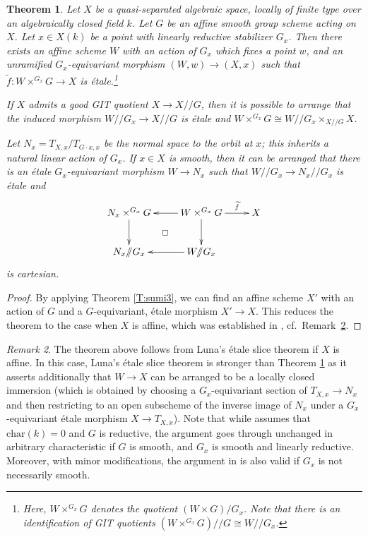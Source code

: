 \documentclass[a4paper]{amsart}
\theoremstyle{plain}
\newtheorem{theorem}{Theorem}[section]
\theoremstyle{definition}
\theoremstyle{remark}
\newtheorem{remark}[theorem]{Remark}
\numberwithin{equation}{section}
\newcommand\co{\colon}
\newcommand{\gitq}{/\!\!/}
\renewcommand{\tilde}{\widetilde}
\begin{document}
\begin{theorem}\label{T:luna}
Let $X$ be a quasi-separated algebraic space, locally of finite type over an algebraically closed field $k$. Let $G$ be an affine smooth group scheme acting on $X$.  Let $x \in X(k)$ be a point with linearly reductive stabilizer $G_x$.   Then there exists an affine scheme $W$ with an action of $G_x$ which fixes a point $w$, and an unramified $G_x$-equivariant morphism $(W,w) \to (X,x)$ such that $\tilde{f} \co W \times^{G_x} G \to X$ is \'etale.\footnote{Here, $W \times^{G_x} G$ denotes the quotient $(W \times G) / G_x$.  Note that there is an identification of GIT quotients  $(W \times^{G_x} G) \gitq G \cong W \gitq G_x$.}

 If $X$ admits a good GIT quotient $X \to X \gitq G$, then it is possible to arrange that the induced morphism $W \gitq G_x \to X \gitq G$ is \'etale and $W \times^{G_x} G \cong W \gitq G_x \times_{X \gitq G} X$.
 
Let $N_x = T_{X,x} / T_{G \cdot x, x}$ be the normal space to the orbit at $x$; this inherits a natural linear action of $G_x$.  If $x \in X$ is smooth, then it can be arranged that there is an \'etale $G_x$-equivariant morphism $W \to N_x$ such that $W \gitq G_x \to N_x \gitq G_x$ is \'etale and 
 $$\xymatrix{
N_x \times^{G_x} G \ar[d] &  W \times^{G_x} G\ar[r]^-{\tilde f} \ar[d] \ar[l]	& X \\
N_x \gitq G_x & W \gitq G_x \ar[l]	\ar@{}[ul]|\square				& 
}$$
is cartesian.
\end{theorem} 
\begin{proof}
By applying Theorem \ref{T:sumi3}, we can find an affine scheme $X'$ with an action of $G$ and a $G$-equivariant, \'etale morphism $X' \to X$.  This reduces the theorem to the case when $X$ is affine, which was established in \cite[p.~97]{luna}, cf.\ Remark~\ref{R:luna}.
\end{proof}

\begin{remark}\label{R:luna}
The theorem above follows from Luna's \'etale slice theorem \cite{luna} if $X$ is affine. In this case, Luna's \'etale slice theorem is stronger than Theorem \ref{T:luna} as it asserts additionally that $W \to X$ can be arranged to be a locally closed immersion (which is obtained by choosing a $G_x$-equivariant section of $T_{X,x} \to N_x$ and then restricting to an open subscheme of the inverse image of $N_x$ under a $G_x$-equivariant \'etale morphism $X \to T_{X,x}$).
Note that while \cite{luna} assumes that $\mathrm{char}(k) = 0$ and $G$ is reductive, the argument goes through unchanged in arbitrary characteristic if $G$ is smooth, and $G_x$ is smooth and linearly reductive.  Moreover, with minor modifications, the argument in \cite{luna} is also valid if $G_x$ is not necessarily smooth.
\end{remark}
\end{document}
